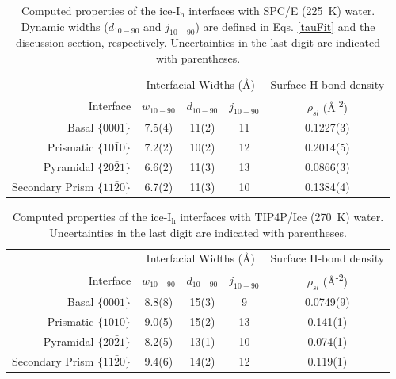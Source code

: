 \begin{table}[h]
\centering
\caption{Computed properties of the
  ice-I$_\mathrm{h}$ interfaces with SPC/E (225~K)
  water. Dynamic widths ($d_\mathrm{10-90}$ and $j_\mathrm{10-90}$)
  are defined in Eqs. \eqref{tauFit} and the discussion section,
  respectively. Uncertainties in the last digit are indicated with
  parentheses.\label{tab:propsSPCE}} 
\begin{tabular}{r|ccc|c}  
  \toprule
  & \multicolumn{3}{c|}{Interfacial Widths (\AA)} & Surface H-bond density \\
  Interface & $w_\mathrm{10-90}$ &  $d_\mathrm{10-90}$ & $j_\mathrm{10-90}$ & $\rho_{sl}$ (\AA\textsuperscript{-2}) \\ 
  \midrule
  Basal  $\{0001\}$                 & 7.5(4) & 11(2) & 11 & 0.1227(3)  \\
  Prismatic  $\{10\bar{1}0\}$       & 7.2(2) & 10(2) & 12 & 0.2014(5)  \\
  Pyramidal  $\{20\bar{2}1\}$       & 6.6(2) & 11(3) & 13 & 0.0866(3)  \\
  Secondary Prism  $\{11\bar{2}0\}$ & 6.7(2) & 11(3) & 10 & 0.1384(4)  \\ 
  \bottomrule
\end{tabular}
\end{table}

\begin{table}[h]
\centering
\caption{Computed properties of the
  ice-I$_\mathrm{h}$ interfaces with TIP4P/Ice (270~K) water. Uncertainties in the last digit are indicated with
  parentheses. \label{tab:propsTIP4P}}
\begin{tabular}{r|ccc|c}  
  \toprule
  & \multicolumn{3}{c|}{Interfacial Widths (\AA)} & 
                                                    Surface H-bond
                                                    density \\
  Interface & $w_\mathrm{10-90}$ &  $d_\mathrm{10-90}$ & $j_\mathrm{10-90}$ & $\rho_{sl}$ (\AA\textsuperscript{-2}) \\ 
  \midrule
  Basal  $\{0001\}$                 & 8.8(8) & 15(3) & 9   & 0.0749(9)\\
  Prismatic  $\{10\bar{1}0\}$       & 9.0(5) & 15(2) & 13  & 0.141(1) \\
  Pyramidal  $\{20\bar{2}1\}$       & 8.2(5) & 13(1) & 10  & 0.074(1) \\
  Secondary Prism  $\{11\bar{2}0\}$ & 9.4(6) & 14(2)   & 12  & 0.119(1) \\
  \bottomrule
\end{tabular}
\end{table}

